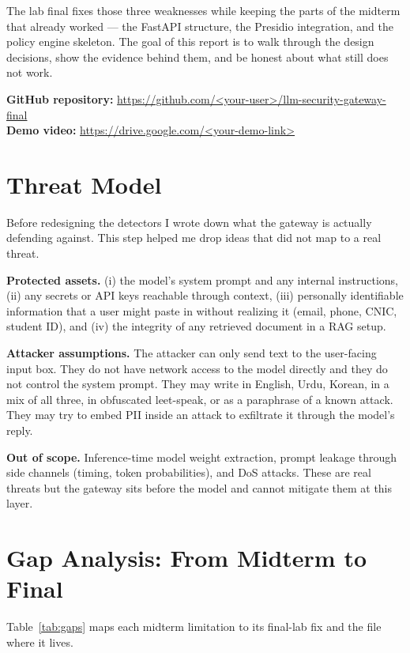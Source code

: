 \documentclass[conference]{IEEEtran}
\begin{document}
The lab final fixes those three weaknesses while keeping the parts of
the midterm that already worked --- the FastAPI structure, the Presidio
integration, and the policy engine skeleton. The goal of this report is
to walk through the design decisions, show the evidence behind them, and
be honest about what still does not work.

\textbf{GitHub repository:} \url{https://github.com/<your-user>/llm-security-gateway-final}\\
\textbf{Demo video:} \url{https://drive.google.com/<your-demo-link>}

\section{Threat Model}
Before redesigning the detectors I wrote down what the gateway is
actually defending against. This step helped me drop ideas that did not
map to a real threat.

\textbf{Protected assets.}
(i) the model's system prompt and any internal instructions,
(ii) any secrets or API keys reachable through context,
(iii) personally identifiable information that a user might paste in
without realizing it (email, phone, CNIC, student ID), and
(iv) the integrity of any retrieved document in a RAG setup.

\textbf{Attacker assumptions.}
The attacker can only send text to the user-facing input box. They do
not have network access to the model directly and they do not control
the system prompt. They may write in English, Urdu, Korean, in a mix of
all three, in obfuscated leet-speak, or as a paraphrase of a known
attack. They may try to embed PII inside an attack to exfiltrate it
through the model's reply.

\textbf{Out of scope.}
Inference-time model weight extraction, prompt leakage through
side channels (timing, token probabilities), and DoS attacks. These are
real threats but the gateway sits before the model and cannot mitigate
them at this layer.

\section{Gap Analysis: From Midterm to Final}

Table~\ref{tab:gaps} maps each midterm limitation to its final-lab fix
and the file where it lives.
\end{document}

